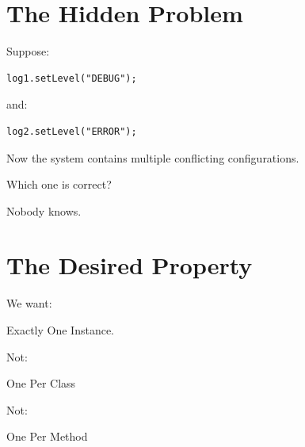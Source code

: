 \documentclass[11pt,a4paper]{book}
\begin{document}
\section{The Hidden Problem}

Suppose:

\begin{verbatim}
log1.setLevel("DEBUG");
\end{verbatim}

and:

\begin{verbatim}
log2.setLevel("ERROR");
\end{verbatim}


Now the system contains
multiple conflicting configurations.


Which one is correct?


Nobody knows.


\section{The Desired Property}

We want:


Exactly One Instance.


Not:


One Per Class


Not:


One Per Method

\end{document}
